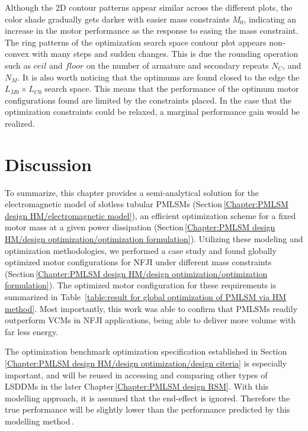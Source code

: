         Although the 2D contour patterns appear similar across the different plots, the color shade gradually gets darker with easier mass constraints $M_0$, indicating an increase in the motor performance as the response to easing the mass constraint. The ring patterns of the optimization search space contour plot appears non-convex with many steps and sudden changes. This is due the rounding operation such as $ceil$ and $floor$ on the number of armature and secondary repeats $N_C$, and $N_M$. It is also worth noticing that the optimums are found closed to the edge the $L_{M0} \times L_{C0}$ search space. This means that the performance of the optimum motor configurations found are limited by the constraints placed. In the case that the optimization constraints could be relaxed, a marginal performance gain would be realized. 


    \section{Discussion}                            \label{Chapter:PMLSM design HM/discussion}
    
        
        To summarize, this chapter provides a semi-analytical solution for the electromagnetic model of slotless tubular \acsp{PMLSM} (Section\,\ref{Chapter:PMLSM design HM/electromagnetic model}), an efficient optimization scheme for a fixed motor mass at a given power dissipation (Section\,\ref{Chapter:PMLSM design HM/design optimization/optimization formulation}). Utilizing these modeling and optimization methodologies, we performed a case study and found globally optimized motor configurations for \acs{NFJI} under different mass constraints (Section\,\ref{Chapter:PMLSM design HM/design optimization/optimization formulation}). The optimized motor configuration for these requirements is summarized in Table~\ref{table:result for global optimization of PMLSM via HM method}. Most importantly, this work was able to confirm that \acsp{PMLSM} readily outperform \acsp{VCM} in \acs{NFJI} applications, being able to deliver more volume with far less energy. 
        
        
        The optimization benchmark optimization specification established in Section\,\ref{Chapter:PMLSM design HM/design optimization/design citeria} is especially important, and will be reused in accessing and comparing other types of \acsp{LSDDM} in the later Chapter\,\ref{Chapter:PMLSM design RSM}. With this modelling approach, it is assumed that the end-effect is ignored. Therefore the true performance will be slightly lower than the performance predicted by this modelling method\,\cite{Ruddy2013a}.
        
        